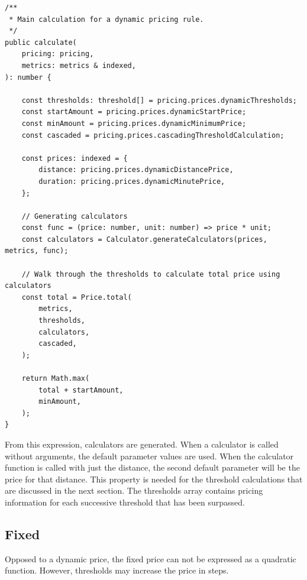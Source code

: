 \begin{center}
\noindent\begin{minipage}{.85\textwidth}
\begin{lstlisting}[caption={Dynamic calculation.}, label={lst:dynamic-calculation}]
/**
 * Main calculation for a dynamic pricing rule.
 */
public calculate(
	pricing: pricing,
	metrics: metrics & indexed,
): number {

	const thresholds: threshold[] = pricing.prices.dynamicThresholds;
	const startAmount = pricing.prices.dynamicStartPrice;
	const minAmount = pricing.prices.dynamicMinimumPrice;
	const cascaded = pricing.prices.cascadingThresholdCalculation;

	const prices: indexed = {
		distance: pricing.prices.dynamicDistancePrice,
		duration: pricing.prices.dynamicMinutePrice,
	};

	// Generating calculators
	const func = (price: number, unit: number) => price * unit;
	const calculators = Calculator.generateCalculators(prices, metrics, func);

	// Walk through the thresholds to calculate total price using calculators
	const total = Price.total(
		metrics,
		thresholds,
		calculators,
		cascaded,
	);

	return Math.max(
		total + startAmount,
		minAmount,
	);
}
\end{lstlisting}
\end{minipage}
\end{center}

From this expression, calculators are generated. When a calculator is called without arguments, the default parameter values are used. When the calculator function is called with just the distance, the second default parameter will be the price for that distance. This property is needed for the threshold calculations that are discussed in the next section. The thresholds array contains pricing information for each successive threshold that has been surpassed.

\subsection{Fixed}
Opposed to a dynamic price, the fixed price can not be expressed as a quadratic function. However, thresholds may increase the price in steps.

